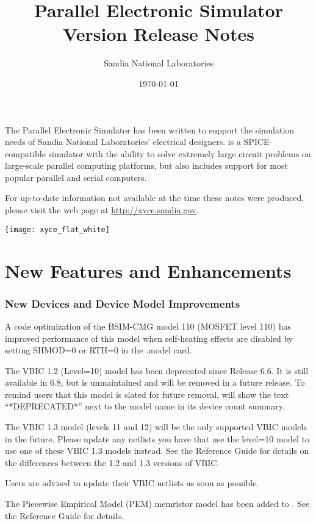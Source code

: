 \documentclass{article}
\title{\XyceTitle{} Parallel Electronic Simulator\\
Version \XyceVersionVar{} Release Notes}
\author{ Sandia National Laboratories}
\date{\today}
\begin{document}
\maketitle

The \XyceTM{} Parallel Electronic Simulator has been written to support the
simulation needs of Sandia National Laboratories' electrical designers.
\XyceTM{} is a SPICE-compatible simulator with the ability to solve extremely
large circuit problems on large-scale parallel computing platforms, but also
includes support for most popular parallel and serial computers.

For up-to-date information not available at the time these notes were produced,
please visit the \XyceTM{} web page at
{\color{XyceDeepRed}\url{http://xyce.sandia.gov}}.


\tableofcontents
\vspace*{\fill}
\parbox{\textwidth}
{
  \hfill
  \texttt{[image: xyce\_flat\_white]}
}


\newpage
\section{New Features and Enhancements}

\subsubsection*{New Devices and Device Model Improvements}
\begin{XyceItemize}
\item A code optimization of the BSIM-CMG model 110 (MOSFET level 110)
  has improved performance of this model when self-heating effects are
  disabled by setting SHMOD=0 or RTH=0 in the .model card.
  
\item The VBIC 1.2 (Level=10) model has been deprecated since \Xyce{}
  Release 6.6.  It is still available in \Xyce{} 6.8, but is
  unmaintained and will be removed in a future release.  To remind
  users that this model is slated for future removal, \Xyce{} will show
  the text ``*DEPRECATED*'' next to the model name in its device count
  summary.

  The VBIC 1.3 model (levels 11 and 12) will be the only supported
  VBIC models in the future.  Please update any netlists you have that
  use the level=10 model to use one of these VBIC 1.3 models instead.
  See the \Xyce{} Reference Guide for details on the differences between
  the 1.2 and 1.3 versions of VBIC.

  Users are advised to update their VBIC netlists as soon as possible.
  
\item The Piecewise Empirical Model (PEM) memristor model has been added to \Xyce{}.  See the 
  \Xyce{} Reference Guide for details.
  
\end{XyceItemize}
\end{document}
